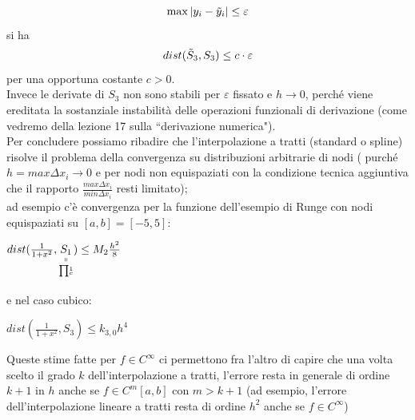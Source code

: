 \[\max |y_i - \Tilde{y}_i| \le \varepsilon\]
si ha \[dist(\Tilde{S}_3, S_3) \le c \cdot \varepsilon\]
per una opportuna costante $c>0$.\\
Invece le derivate di $S_3$ non sono stabili per $\varepsilon$ fissato e $h \to 0$, perché viene ereditata la sostanziale instabilità delle operazioni funzionali di derivazione (come vedremo della lezione 17 sulla ``derivazione numerica").\\
Per concludere possiamo ribadire che l'interpolazione a tratti (standard o spline) risolve il problema della convergenza su distribuzioni arbitrarie di nodi ( purché $h=max\Delta x_i \rightarrow 0$ e per nodi non equispaziati con la condizione tecnica aggiuntiva che il rapporto $\frac{max\Delta x_i}{min\Delta x_i}$ resti limitato);\\
ad esempio c'è convergenza per la funzione dell'esempio di Runge con nodi equispaziati su $[a,b]=[-5,5]$:\\
\begin{center}
    $dist(\frac{1}{1+x^2}, \underset{\underset{\begin{matrix}\prod\end{matrix}^1_c}{\shortparallel}}{S_1}) \leq M_2 \frac{h^2}{8}$
\end{center}
e nel caso cubico: 
\begin{center}
$dist(\frac{1}{1+x^2},S_3)\leq k_{3,0} h^4$\\
\end{center}
Queste stime fatte per $f \in C^\infty$ ci permettono fra l'altro di capire che una volta scelto il grado $k$ dell'interpolazione a tratti, l'errore resta in generale di ordine $k+1$ in $h$ anche se $f \in C^m [a,b]$ con $m > k+1$ (ad esempio, l'errore dell'interpolazione lineare a tratti resta di ordine $h^2$ anche se $f \in C^\infty$)
\newpage

